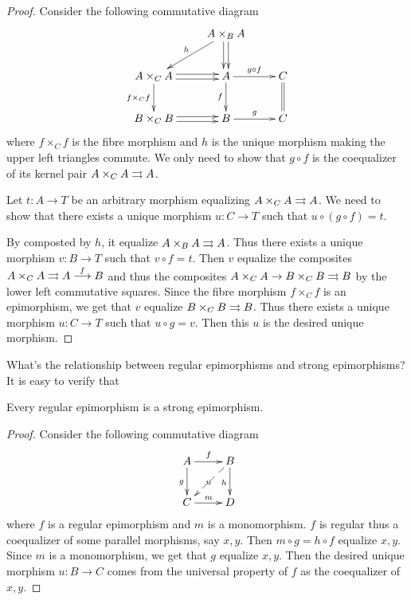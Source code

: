   \begin{proof}
    Consider the following commutative diagram
    \begin{displaymath}
      \xymatrix{
         &A\times_BA\ar@<0.5ex>[d]^-{}\ar@<-0.5ex>[d]_-{}\ar[dl]_{h}&\\
         A\times_CA\ar@<0.5ex>[r]^-{}\ar@<-0.5ex>[r]_-{}\ar[d]_{f\times_Cf}
         &A\ar[r]^-{g\circ f}\ar[d]_-{f}&C\ar@{=}[d]\\
         B\times_CB\ar@<0.5ex>[r]^-{}\ar@<-0.5ex>[r]_-{}&B\ar[r]^-{g}&C
      }
    \end{displaymath}
    where $f\times_Cf$ is the fibre morphism and $h$ is the unique morphism making the upper left triangles commute. We only need to show that $g\circ f$ is the coequalizer of its kernel pair $A\times_CA\rightrightarrows A$.

    Let $t\colon A\to T$ be an arbitrary morphism equalizing $A\times_CA\rightrightarrows A$. We need to show that there exists a unique morphism $u\colon C\to T$ such that $u\circ (g\circ f) = t$.

    By composted by $h$, it equalize $A\times_BA\rightrightarrows A$. Thus there exists a unique morphism $v\colon B\to T$ such that $v\circ f = t$. Then $v$ equalize the composites $A\times_CA\rightrightarrows A\stackrel{{f}}{\longrightarrow} B$ and thus the composites $A\times_CA\to B\times_CB\rightrightarrows B$ by the lower left commutative squares. Since the fibre morphism $f\times_Cf$ is an epimorphism, we get that $v$ equalize $B\times_CB\rightrightarrows B$. Thus there exists a unique morphism $u\colon C\to T$ such that $u\circ g = v$. Then this $u$ is the desired unique morphism.
  \end{proof}

  What's the relationship between regular epimorphisms and strong epimorphisms? It is easy to verify that
  \begin{prop}
    Every regular epimorphism is a strong epimorphism.
  \end{prop}
  \begin{proof}
    Consider the following commutative diagram
        \begin{displaymath}
          \xymatrix{
            A\ar[r]^{f}\ar[d]_{g}&B\ar[d]_{h}\ar@{-->}[dl]|{u}\\
            C\ar[r]^{m}&D
          }
        \end{displaymath}
    where $f$ is a regular epimorphism and $m$ is a monomorphism. $f$ is regular thus a coequalizer of some parallel morphisms, say $x,y$. Then $m\circ g = h\circ f$ equalize $x,y$. Since $m$ is a monomorphism, we get that $g$ equalize $x,y$. Then the desired unique morphism $u\colon B\to C$ comes from the universal property of $f$ as the coequalizer of $x,y$.
  \end{proof}

